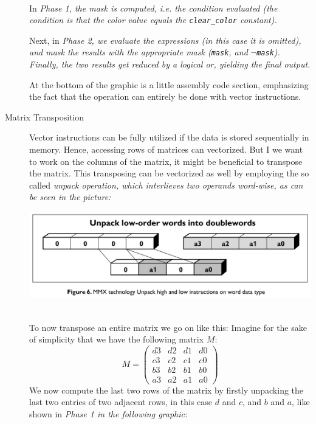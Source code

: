 \documentclass[../../main.tex]{subfiles}
\begin{document}
\begin{description}
    ~\\
    In \em Phase 1\em , the mask is computed, i.e. the condition evaluated (the condition is that the color value equals the \texttt{clear\_color} constant).

    Next, in \em Phase 2\em , we evaluate the expressions (in this case it is omitted), and mask the results with the appropriate mask (\texttt{mask}, and $\lnot$\texttt{mask}). Finally, the two results get reduced by a logical or, yielding the final output.

    At the bottom of the graphic is a little assembly code section, emphasizing the fact that the operation can entirely be done with vector instructions.

    \bigskip
    \item[Matrix Transposition] Vector instructions can be fully utilized if the data is stored sequentially in memory. Hence, accessing rows of matrices can vectorized. But I we want to work on the columns of the matrix, it might be beneficial to transpose the matrix. This transposing can be vectorized as well by employing the so called \em unpack \em operation, which interlieves two operands word-wise, as can be seen in the picture:

    \includegraphics[width=\textwidth]{Chapters/07/unpack.png}

    ~\\
    To now transpose an entire matrix we go on like this: Imagine for the sake of simplicity that we have the following matrix $M$:
    \[ M = \begin{pmatrix}
        d3 & d2 & d1 & d0 \\
        c3 & c2 & c1 & c0 \\
        b3 & b2 & b1 & b0 \\
        a3 & a2 & a1 & a0
    \end{pmatrix}\]
    We now compute the last two rows of the matrix by firstly unpacking the last two entries of two adjacent rows, in this case $d$ and $c$, and $b$ and $a$, like shown in \em Phase 1 \em in the following graphic:


\end{description}
\end{document}
